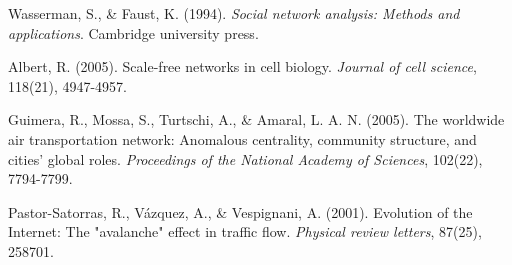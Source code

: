 \begin{thebibliography}{9}
Wasserman, S., \& Faust, K. (1994). \textit{Social network analysis: Methods and applications}. Cambridge university press.

Albert, R. (2005). Scale-free networks in cell biology. \textit{Journal of cell science}, 118(21), 4947-4957.

Guimera, R., Mossa, S., Turtschi, A., \& Amaral, L. A. N. (2005). The worldwide air transportation network: Anomalous centrality, community structure, and cities' global roles. \textit{Proceedings of the National Academy of Sciences}, 102(22), 7794-7799.

Pastor-Satorras, R., Vázquez, A., \& Vespignani, A. (2001). Evolution of the Internet: The "avalanche" effect in traffic flow. \textit{Physical review letters}, 87(25), 258701.

\end{thebibliography}